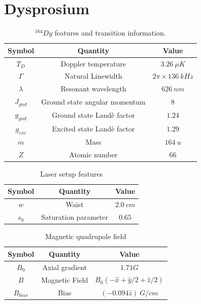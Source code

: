 %
\section{Dysprosium}
\label{sec:dysprosium}
%

\begin{table}[ht!]
    \centering
    \begin{tabular}{|c|c|c|}
        \hline
        \textbf{Symbol} & \textbf{Quantity} & \textbf{Value} \\ \hline
        $ T_D $ & Doppler temperature & $ 3.26\ \mu K $ \\
        $ \Gamma $ & Natural Linewidth & $ 2\pi \times 136\ kHz $ \\
        $ \lambda $ & Resonant wavelength & $ 626\ nm $ \\
        $ J_{gnd} $ & Ground state angular momentum & $ 8 $ \\
        $ g_{gnd} $ & Ground state Landè factor & $ 1.24 $ \\
        $ g_{exc} $ & Excited state Landè factor & $ 1.29 $ \\
        $ m $ & Mass & $ 164\ u $ \\
        $ Z $ & Atomic number & $ 66 $ \\
        \hline
    \end{tabular}
    \caption{$ {}^{164}Dy $ features and transition information.}
    \label{tab:164Dy}
\end{table}

\begin{table}[ht!]
    \centering
    \begin{tabular}{|c|c|c|}
        \hline
        \textbf{Symbol} & \textbf{Quantity} & \textbf{Value} \\ \hline
        $ w $ & Waist & $ 2.0\ cm $ \\
        $ s_0 $ & Saturation parameter & $ 0.65 $ \\
        \hline
    \end{tabular}
    \caption{Laser setup features}
    \label{tab:lasers-setup}
\end{table}

\begin{table}[ht!]
    \centering
    \begin{tabular}{|c|c|c|}
        \hline
        \textbf{Symbol} & \textbf{Quantity} & \textbf{Value} \\ \hline
        $ B_0 $ & Axial gradient & $ 1.71 G $ \\
        $ B $ & Magnetic Field & $ B_0(-\hat{x} + \hat{y}/2 + \hat{z} / 2) $ \\
        $ B_{bias} $ & Bias & $ (-0.094 \hat{z})\ G / cm $ \\
        \hline
    \end{tabular}
    \caption{Magnetic quadrupole field}
    \label{tab:magnetic-field}
\end{table}


